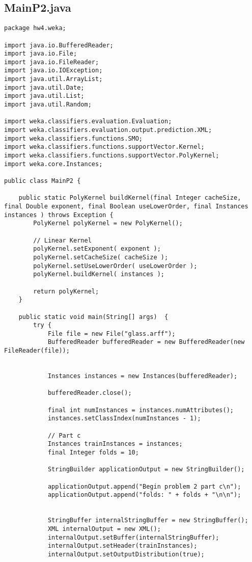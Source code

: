 \subsection{MainP2.java}

\begin{lstlisting}
package hw4.weka;

import java.io.BufferedReader;
import java.io.File;
import java.io.FileReader;
import java.io.IOException;
import java.util.ArrayList;
import java.util.Date;
import java.util.List;
import java.util.Random;

import weka.classifiers.evaluation.Evaluation;
import weka.classifiers.evaluation.output.prediction.XML;
import weka.classifiers.functions.SMO;
import weka.classifiers.functions.supportVector.Kernel;
import weka.classifiers.functions.supportVector.PolyKernel;
import weka.core.Instances;

public class MainP2 {
		
	public static PolyKernel buildKernel(final Integer cacheSize, final Double exponent, final Boolean useLowerOrder, final Instances instances ) throws Exception {
		PolyKernel polyKernel = new PolyKernel();
		
		// Linear Kernel
		polyKernel.setExponent( exponent );
		polyKernel.setCacheSize( cacheSize );
		polyKernel.setUseLowerOrder( useLowerOrder );
		polyKernel.buildKernel( instances );
		
		return polyKernel;
	}
	
	public static void main(String[] args)  {
		try {
			File file = new File("glass.arff");
			BufferedReader bufferedReader = new BufferedReader(new FileReader(file));
			
			
			Instances instances = new Instances(bufferedReader);
			
			bufferedReader.close();
			
			final int numInstances = instances.numAttributes();			
			instances.setClassIndex(numInstances - 1);
			
			// Part c			
			Instances trainInstances = instances;
			final Integer folds = 10;

			StringBuilder applicationOutput = new StringBuilder();

			applicationOutput.append("Begin problem 2 part c\n");
			applicationOutput.append("folds: " + folds + "\n\n");

				
			StringBuffer internalStringBuffer = new StringBuffer();
			XML internalOutput = new XML();
			internalOutput.setBuffer(internalStringBuffer);
			internalOutput.setHeader(trainInstances);
			internalOutput.setOutputDistribution(true);


\end{lstlisting}
